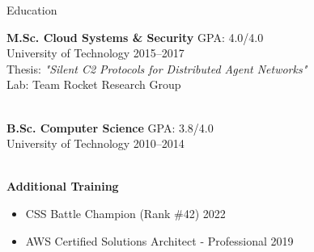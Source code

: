 \begin{rSection}{Education}
\begin{samepage}
\textbf{M.Sc. Cloud Systems \& Security} \hfill GPA: 4.0/4.0 \\
University of Technology \hfill 2015--2017 \\
Thesis: \textit{"Silent C2 Protocols for Distributed Agent Networks"} \\
\unless\ifpublic Lab: Team Rocket Research Group \\ \fi
\end{samepage} \\
\textbf{B.Sc. Computer Science} \hfill GPA: 3.8/4.0 \\
University of Technology \hfill 2010--2014 \\ \\
\begin{samepage}
\textbf{Additional Training}
\begin{itemize}
  \iffrontend \item CSS Battle Champion (Rank \#42) \hfill 2022 \fi
  \item AWS Certified Solutions Architect - Professional \hfill 2019
\end{itemize}
\end{samepage}
\end{rSection}